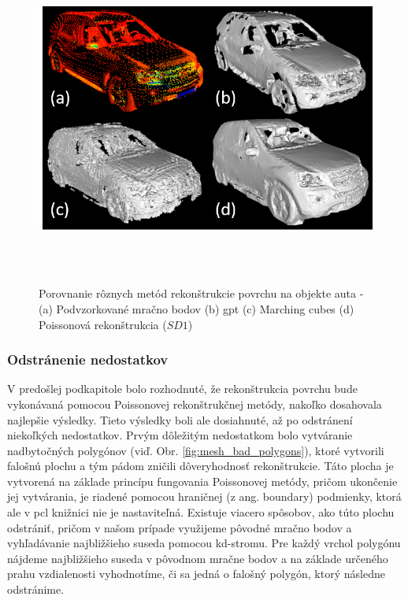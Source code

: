 \begin{figure}[!htbp]
  \centering
  \includegraphics[width=16cm, height=11cm]{img/mesh_methods_compararison.png}
  \caption{Porovnanie rôznych metód rekonštrukcie povrchu na objekte auta - (a) Podvzorkované mračno bodov (b) \acrshort{gpt} (c) Marching cubes (d) Poissonová rekonštrukcia ($SD1$)} 
  \label{fig:mesh_compararison}
\end{figure} 

\subsubsection{Odstránenie nedostatkov}
\noindent V predošlej podkapitole bolo rozhodnuté, že rekonštrukcia povrchu bude vykonávaná pomocou Poissonovej rekonštrukčnej metódy, nakoľko dosahovala najlepšie výsledky. Tieto výsledky boli ale dosiahnuté, až po odstránení niekoľkých nedostatkov. 
\newline\indent Prvým dôležitým nedostatkom bolo vytváranie nadbytočných polygónov (viď. Obr. \ref{fig:mesh_bad_polygons}), ktoré vytvorili falošnú plochu a tým pádom zničili dôveryhodnosť rekonštrukcie. Táto plocha je vytvorená na základe princípu fungovania Poissonovej metódy, pričom ukončenie jej vytvárania, je riadené pomocou hraničnej (z ang. boundary) podmienky, ktorá ale v \acrshort{pcl} knižnici nie je nastaviteľná. Existuje viacero spôsobov, ako túto plochu odstrániť, pričom v našom prípade využijeme pôvodné mračno bodov a vyhľadávanie najbližšieho suseda pomocou kd-stromu. Pre každý vrchol polygónu nájdeme najbližšieho suseda v pôvodnom mračne bodov a na základe určeného prahu vzdialenosti vyhodnotíme, či sa jedná o falošný polygón, ktorý následne odstránime.


